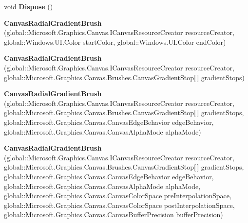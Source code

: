 \begin{DoxyCompactItemize}
void {\bfseries Dispose} ()
\item 
\mbox{\label{class_microsoft_1_1_graphics_1_1_canvas_1_1_brushes_1_1_canvas_radial_gradient_brush_a63863bff18c4d0e79ecfc400e0f0752f}} 
{\bfseries Canvas\+Radial\+Gradient\+Brush} (global\+::\+Microsoft.\+Graphics.\+Canvas.\+I\+Canvas\+Resource\+Creator resource\+Creator, global\+::\+Windows.\+U\+I.\+Color start\+Color, global\+::\+Windows.\+U\+I.\+Color end\+Color)
\item 
\mbox{\label{class_microsoft_1_1_graphics_1_1_canvas_1_1_brushes_1_1_canvas_radial_gradient_brush_aa2c2fd59d76619f8d908b988059d5e2c}} 
{\bfseries Canvas\+Radial\+Gradient\+Brush} (global\+::\+Microsoft.\+Graphics.\+Canvas.\+I\+Canvas\+Resource\+Creator resource\+Creator, global\+::\+Microsoft.\+Graphics.\+Canvas.\+Brushes.\+Canvas\+Gradient\+Stop\mbox{[}$\,$\mbox{]} gradient\+Stops)
\item 
\mbox{\label{class_microsoft_1_1_graphics_1_1_canvas_1_1_brushes_1_1_canvas_radial_gradient_brush_a72a997087b68baa682963acf4c7547b0}} 
{\bfseries Canvas\+Radial\+Gradient\+Brush} (global\+::\+Microsoft.\+Graphics.\+Canvas.\+I\+Canvas\+Resource\+Creator resource\+Creator, global\+::\+Microsoft.\+Graphics.\+Canvas.\+Brushes.\+Canvas\+Gradient\+Stop\mbox{[}$\,$\mbox{]} gradient\+Stops, global\+::\+Microsoft.\+Graphics.\+Canvas.\+Canvas\+Edge\+Behavior edge\+Behavior, global\+::\+Microsoft.\+Graphics.\+Canvas.\+Canvas\+Alpha\+Mode alpha\+Mode)
\item 
\mbox{\label{class_microsoft_1_1_graphics_1_1_canvas_1_1_brushes_1_1_canvas_radial_gradient_brush_a5bcd11137c2799ca1ee5edea427d5ecb}} 
{\bfseries Canvas\+Radial\+Gradient\+Brush} (global\+::\+Microsoft.\+Graphics.\+Canvas.\+I\+Canvas\+Resource\+Creator resource\+Creator, global\+::\+Microsoft.\+Graphics.\+Canvas.\+Brushes.\+Canvas\+Gradient\+Stop\mbox{[}$\,$\mbox{]} gradient\+Stops, global\+::\+Microsoft.\+Graphics.\+Canvas.\+Canvas\+Edge\+Behavior edge\+Behavior, global\+::\+Microsoft.\+Graphics.\+Canvas.\+Canvas\+Alpha\+Mode alpha\+Mode, global\+::\+Microsoft.\+Graphics.\+Canvas.\+Canvas\+Color\+Space pre\+Interpolation\+Space, global\+::\+Microsoft.\+Graphics.\+Canvas.\+Canvas\+Color\+Space post\+Interpolation\+Space, global\+::\+Microsoft.\+Graphics.\+Canvas.\+Canvas\+Buffer\+Precision buffer\+Precision)

\end{DoxyCompactItemize}
